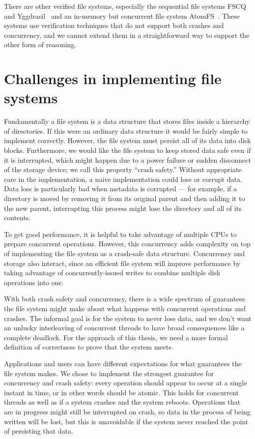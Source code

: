 There are other verified file systems, especially the sequential file systems
FSCQ~\cite{chen:fscq} and Yggdrasil~\cite{sigurbjarnarson:yggdrasil} and an
in-memory but concurrent file system AtomFS~\cite{zou:atomfs}. These systems use
verification techniques that do not support both crashes and concurrency, and we
cannot extend them in a straightforward way to support the other form of reasoning.

\section{Challenges in implementing file systems}

Fundamentally a file system is a data structure that stores files inside a
hierarchy of directories. If this were an ordinary data structure it would be
fairly simple to implement correctly. However, the file system must persist all
of its data into disk blocks. Furthermore, we would like the file system to keep
stored data safe even if it is interrupted, which might happen due to a power
failure or sudden disconnect of the storage device; we call this property
``crash safety.'' Without appropriate care in the implementation, a naive
implementation could lose or corrupt data. Data loss is particularly bad when
metadata is corrupted --- for example, if a directory is moved by removing it
from its original parent and then adding it to the new parent, interrupting this
process might lose the directory and all of its contents.

To get good performance, it is helpful to take advantage of multiple CPUs to
prepare concurrent operations. However, this concurrency adds complexity on top
of implementing the file system as a crash-safe data structure. Concurrency and
storage also interact, since an efficient file system will improve performance
by taking advantage of concurrently-issued writes to combine multiple disk
operations into one.

With both crash safety and concurrency, there is a wide spectrum of guarantees
the file system might make about what happens with concurrent operations and
crashes. The informal goal is for the system to never lose data, and we don't want
an unlucky interleaving of concurrent threads to have broad consequences like a
complete deadlock. For the approach of this thesis, we need a more formal
definition of correctness to prove that the system meets.

Applications and users can have different expectations for what guarantees the
file system makes. We chose to implement the strongest guarantee for concurrency
and crash safety: every operation should appear to occur at a single instant in
time, or in other words should be atomic. This holds for concurrent threads as
well as if a system crashes and the system reboots. Operations that are in
progress might still be interrupted on crash, so data in the process of being
written will be lost, but this is unavoidable if the system never reached the
point of persisting that data.

